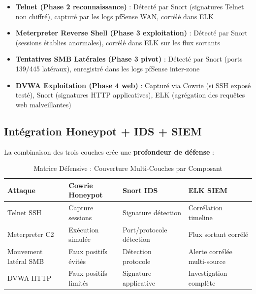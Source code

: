 \documentclass[12pt,a4paper,openany]{report}
\newcommand{\tableheadcolor}{\rowcolor{tableheadbg}}
\begin{document}
	\begin{itemize}
		\item \textbf{Telnet (Phase 2 reconnaissance)} : Détecté par Snort (signatures Telnet non chiffré), capturé par les logs pfSense WAN, corrélé dans ELK
		\item \textbf{Meterpreter Reverse Shell (Phase 3 exploitation)} : Détecté par Snort (sessions établies anormales), corrélé dans ELK sur les flux sortants
		\item \textbf{Tentatives SMB Latérales (Phase 3 pivot)} : Détecté par Snort (ports 139/445 latéraux), enregistré dans les logs pfSense inter-zone
		\item \textbf{DVWA Exploitation (Phase 4 web)} : Capturé via Cowrie (si SSH exposé testé), Snort (signatures HTTP applicatives), ELK (agrégation des requêtes web malveillantes)
	\end{itemize}
	
	\subsection{Intégration Honeypot + IDS + SIEM}
	
	La combinaison des trois couches crée une \textbf{profondeur de défense} :
	
	\begin{table}[H]
		\centering
		\small
		\renewcommand{\arraystretch}{1.3}
		\setlength{\arrayrulewidth}{0.5pt}
		\begin{tabular}{p{2.5cm} p{3.5cm} p{3.5cm} p{3.5cm}}
			\arrayrulecolor{tableborder}
			\hline
			\tableheadcolor
			\textcolor{tableheadfg}{\textbf{Attaque}} &
			\textcolor{tableheadfg}{\textbf{Cowrie Honeypot}} &
			\textcolor{tableheadfg}{\textbf{Snort IDS}} &
			\textcolor{tableheadfg}{\textbf{ELK SIEM}} \\
			\hline
			\rowcolor{tablerowalt}
			Telnet SSH & Capture sessions & Signature détection & Corrélation timeline \\
			Meterpreter C2 & Exécution simulée & Port/protocole détection & Flux sortant corrélé \\
			\rowcolor{tablerowalt}
			Mouvement latéral SMB & Faux positifs évités & Détection protocole & Alerte corrélée multi-source \\
			DVWA HTTP & Faux positifs limités & Signature applicative & Investigation complète \\
			\hline
		\end{tabular}
		\caption{Matrice Défensive : Couverture Multi-Couches par Composant}
		\label{tab:defense-matrix}
	\end{table}
	
\end{document}
